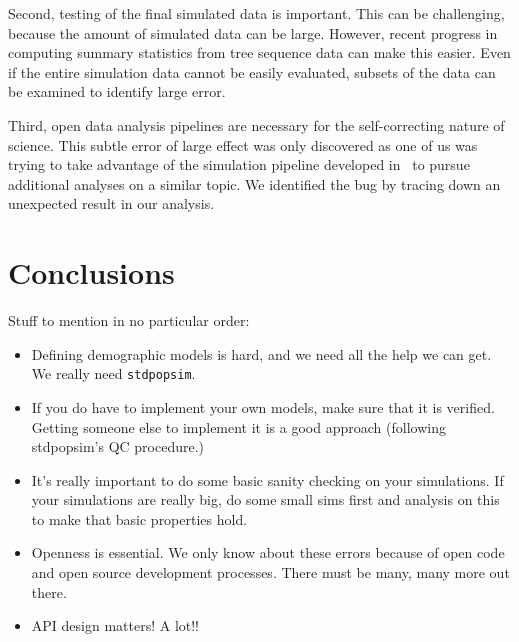 \documentclass{article}
\newcommand{\stdpopsim}[0]{\texttt{stdpopsim}}
\begin{document}
Second, testing of the final simulated data is important. This can be challenging, 
because the amount of simulated data can be large. However, recent progress in 
computing summary statistics from tree sequence data \cite{} can make this easier. 
Even if the entire simulation data cannot be easily evaluated, subsets of the data 
can be examined to identify large error.  

Third, open data analysis pipelines are necessary for the self-correcting nature of science. 
This subtle error of large effect was only discovered as one of us was trying to take
advantage of the simulation pipeline developed in~\citep{martin2017human} to pursue 
additional analyses on a similar topic. We identified the bug by tracing down an unexpected 
result in our analysis.  

\section{Conclusions}

Stuff to mention in no particular order:
\begin{itemize}
\item Defining demographic models is hard, and we need all the help we can get.
   We really need \stdpopsim.
\item If you do have to implement your own models, make sure that it is
verified. Getting someone else to implement it is a good approach (following
stdpopsim's QC procedure.)
\item It's really important to do some basic sanity checking on your
simulations. If your simulations are really big, do some small sims first and
analysis on this to make that basic properties hold.
\item Openness is essential. We only know about these errors because of
open code and open source development processes. There must be many, many more
out there.
\item API design matters! A lot!!
\end{itemize}



\end{document}
